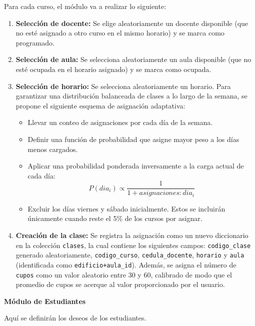 \documentclass{article}
\begin{document}
Para cada curso, el módulo va a realizar lo siguiente:

\begin{enumerate}
  \item \textbf{Selección de docente:} Se elige aleatoriamente un docente disponible 
        (que no esté asignado a otro curso en el mismo horario) y se marca como programado.
  
  \item \textbf{Selección de aula:} Se selecciona aleatoriamente un aula disponible 
        (que no esté ocupada en el horario asignado) y se marca como ocupada.

  \item \textbf{Selección de horario:} Se selecciona aleatoriamente un horario. Para garantizar 
        una distribución balanceada de clases a lo largo de la semana, se propone el siguiente 
        esquema de asignación adaptativa:

  \begin{itemize}
    \item Llevar un conteo de asignaciones por cada día de la semana.
    \item Definir una función de probabilidad que asigne mayor peso a los días menos cargados.
    \item Aplicar una probabilidad ponderada inversamente a la carga actual de cada día:
      $$
      P(dia_{i}) \propto \frac{1}{1 + asignaciones:dia_{i}}
      $$
    \item Excluir los días viernes y sábado inicialmente. Estos se incluirán únicamente cuando 
          reste el 5\% de los cursos por asignar.
  \end{itemize}

  \item \textbf{Creación de la clase:} Se registra la asignación como un nuevo diccionario en 
        la colección \texttt{clases}, la cual contiene los siguientes campos: 
        \texttt{codigo\_clase} generado aleatoriamente, \texttt{codigo\_curso}, 
        \texttt{cedula\_docente}, 
        \texttt{horario} y \texttt{aula} (identificada como \texttt{edificio+aula\_id}).
        Además, se asigna el número de \texttt{cupos} como un valor aleatorio entre 30 y 60, 
        calibrado de modo que el promedio de cupos se acerque al valor proporcionado por el usuario.
\end{enumerate}



\textbf{Módulo de Estudiantes}

Aquí se definirán los deseos de los estudiantes.
\end{document}
